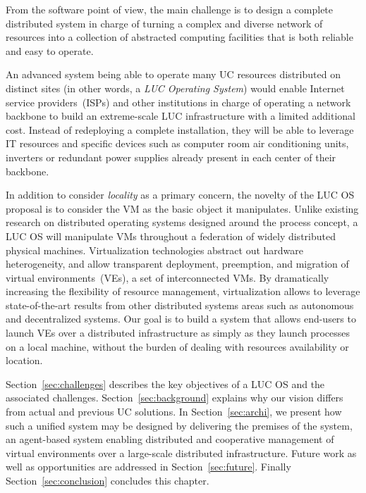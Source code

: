 From the software point of view, the main challenge is to design a complete distributed
system in charge of turning a complex and diverse network of resources into a collection
of abstracted computing facilities that is both reliable and easy to operate.

\begin{svgraybox}
An advanced system being able to operate 
many UC resources distributed on distinct sites (in other words, a \emph{LUC
  Operating System}) would enable%
Internet service providers~(ISPs) and other institutions in
charge of operating a network backbone to build an extreme-scale
LUC infrastructure with a limited additional cost. Instead of redeploying a
complete installation, they will be able to leverage IT resources and
specific devices such as computer room air conditioning units, inverters or
redundant power supplies already present in each center of their
backbone. 
\end{svgraybox}


\medskip

In addition to consider \emph{locality} as a primary concern, the novelty of the LUC OS
proposal is to consider the VM as the basic object it manipulates.  Unlike existing
research on distributed operating systems designed around the process concept, a LUC OS will manipulate VMs throughout a federation of widely distributed
physical machines. Virtualization technologies abstract out hardware heterogeneity, and allow
transparent deployment, preemption, and migration of virtual
environments~(VEs), \ie a set of interconnected VMs.
By dramatically increasing the flexibility of resource management, virtualization 
allows to leverage state-of-the-art results from other distributed
systems areas such as autonomous and decentralized systems.  
Our goal is to build a system that allows end-users to launch VEs over a
distributed infrastructure as simply as they launch processes on a
local machine, \ie  without the burden of dealing with resources
availability or location.

Section~\ref{sec:challenges} describes the key objectives of a LUC OS and the associated challenges. 
Section~\ref{sec:background} explains why our vision differs from actual and previous UC solutions. In
Section~\ref{sec:archi}, we present how such a unified system may be designed
by delivering the premises of the \discovery system, an agent-based system
enabling distributed and cooperative management of virtual environments over a
large-scale distributed infrastructure.
Future work as well as opportunities  are addressed in Section~\ref{sec:future}. Finally Section~\ref{sec:conclusion} concludes this chapter. 
